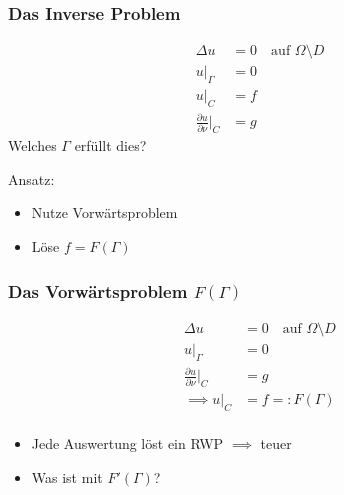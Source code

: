 \documentclass[draft]{beamer}
\begin{document}
\begin{frame}
	\frametitle{Das Inverse Problem}
	\begin{minipage}{0.5\textwidth}
		\begin{align*}
			\Delta u &= 0 \quad \text{auf $\Omega \setminus D$} \\
			u|_\Gamma &= 0 \\
			u|_C &= f \\
			\tfrac{\partial u}{\partial \nu}|_C &= g
		\end{align*}
		\pause
		Welches $\Gamma$ erfüllt dies?
	\end{minipage}
	\begin{minipage}{0.48\textwidth}
		\pause
		Ansatz:
		\begin{itemize}
			\item
				Nutze Vorwärtsproblem
			\item
				Löse $f = F(\Gamma)$
		\end{itemize}
	\end{minipage}
\end{frame}

\begin{frame}
	\frametitle{Das Vorwärtsproblem $F(\Gamma)$}
	\begin{minipage}{0.5\textwidth}
		\begin{align*}
			\Delta u &= 0 \quad \text{auf $\Omega \setminus D$} \\
			u|_\Gamma &= 0 \\
			\tfrac{\partial u}{\partial \nu}|_C &= g \\
			\implies u|_C &= f =: F(\Gamma) \\
		\end{align*}
	\end{minipage}
	\begin{minipage}{0.48\textwidth}
		\begin{itemize}
			\item \pause
				Jede Auswertung löst ein RWP $\implies$ teuer
			\item \pause
				Was ist mit $F'(\Gamma)$?
		\end{itemize}
	\end{minipage}
\end{frame}
\end{document}
